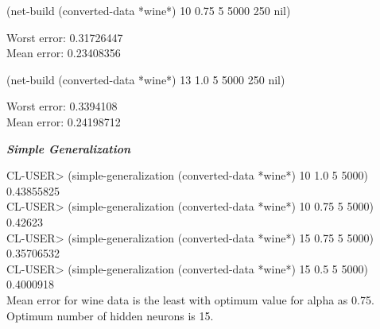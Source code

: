 \documentclass{article}
\begin{document}
\begin{small}
 (net-build (converted-data *wine*) 10 0.75 5 5000 250 nil)
\end{small}

\begin{flushleft}
\begin{normalsize}
Worst error: 0.31726447\\
Mean error: 0.23408356\\
\end{normalsize}
\end{flushleft}
 
\begin{small}
(net-build (converted-data *wine*) 13 1.0 5 5000 250 nil)
\end{small}

\begin{flushleft}
\begin{normalsize}
Worst error: 0.3394108\\
Mean error: 0.24198712\\
\end{normalsize}
\end{flushleft}

 
\textbf{\emph{Simple Generalization}}

 \begin{flushleft}
 {\normalsize 
 CL-USER> (simple-generalization (converted-data *wine*) 10 1.0 5 5000)\\
0.43855825\\
CL-USER> (simple-generalization (converted-data *wine*) 10 0.75 5 5000)\\
0.42623\\
CL-USER> (simple-generalization (converted-data *wine*) 15 0.75 5 5000)\\
0.35706532\\
CL-USER> (simple-generalization (converted-data *wine*) 15 0.5 5 5000)\\
0.4000918
}\\

{\normalsize Mean error for wine data is the least with optimum value for alpha as 0.75. Optimum number of hidden neurons is 15.\\}
 
 \end{flushleft}
\end{document}
